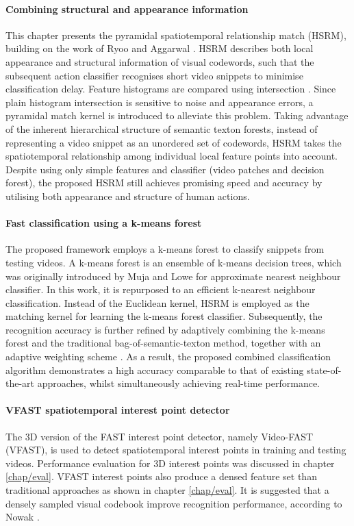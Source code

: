 \paragraph{Combining structural and appearance information} This chapter presents the pyramidal spatiotemporal relationship match (HSRM), building on the work of Ryoo and Aggarwal \cite{Ryoo2009}. HSRM describes both local appearance and structural information of visual codewords, such that the subsequent action classifier recognises short video snippets to minimise classification delay. Feature histograms are compared using intersection \cite{Ryoo2009}. Since plain histogram intersection is sensitive to noise and appearance errors, a pyramidal match kernel \cite{Grauman2005} is introduced to alleviate this problem. Taking advantage of the inherent hierarchical structure of semantic texton forests, instead of representing a video snippet as an unordered set of codewords, HSRM takes the spatiotemporal relationship among individual local feature points into account. Despite using only simple features and classifier (video patches and decision forest), the proposed HSRM still achieves promising speed and accuracy by utilising both appearance and structure of human actions. 


\paragraph{Fast classification using a k-means forest} The proposed framework employs a k-means forest to classify snippets from testing videos. A k-means forest is an ensemble of k-means decision trees, which was originally introduced by Muja and Lowe \cite{Muja2009} for approximate nearest neighbour classifier. In this work, it is repurposed to an efficient k-nearest neighbour classification. Instead of the Euclidean kernel, HSRM is employed as the matching kernel for learning the k-means forest classifier. Subsequently, the recognition accuracy is further refined by adaptively combining the k-means forest and the traditional bag-of-semantic-texton method, together with an adaptive weighting scheme \cite{Shotton2008}. As a result, the proposed combined classification algorithm demonstrates a high accuracy comparable to that of existing state-of-the-art approaches, whilst simultaneously achieving real-time performance. 

\paragraph{VFAST spatiotemporal interest point detector} The 3D version of the FAST interest point detector, namely Video-FAST (VFAST), is used to detect spatiotemporal interest points in training and testing videos. Performance evaluation for 3D interest points was discussed in chapter \ref{chap/eval}. VFAST interest points also produce a densed feature set than traditional approaches as shown in chapter \ref{chap/eval}. It is suggested that a densely sampled visual codebook improve recognition performance, according to Nowak \etal \cite{Nowak2006}.

